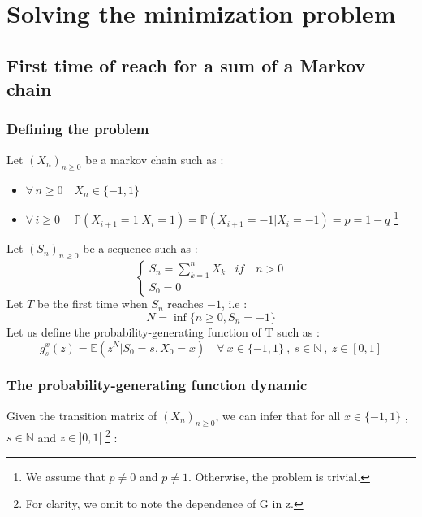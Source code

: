 \documentclass{article}
\begin{document}
\newpage
\section{Solving the minimization problem}
\subsection{First time of reach for a sum of a Markov chain}
\subsubsection{Defining the problem}

Let $(X_{n})_{n\geq0}$ be a markov chain such as :
\begin{itemize}
\item $\forall \, n\geq0 \quad X_{n} \in \{-1,1\} $ 
\item $\forall \, i\geq0 \quad\ \mathbb{P}( X_{i+1}=1 | X_{i}=1 ) = \mathbb{P}( X_{i+1}=-1 | X_{i}=-1 ) = p = 1-q$ \footnote{We assume that $p \ne 0$ and $p \ne 1$. Otherwise, the problem is trivial.}
\end{itemize}
Let $(S_{n})_{n\geq0}$ be a sequence such as :
\begin{equation}
     \begin{cases}
        S_{n} = \sum_{k=1}^{n}X_{k} & if \quad n > 0 \\
        S_{0} = 0
     \end{cases}
\end{equation}
Let $T$ be the first time when $S_{n}$ reaches $-1$, i.e  :
$$ N= \inf \{ n\geq0 , S_{n}=-1   \} $$
Let us define the  probability-generating function of T such as :
$$ g_{s}^{x}(z) = \mathbb{E}(z^{N} | S_{0}=s, X_{0}=x) \quad \forall \ x \in \{-1,1\} \ , \ s \in \mathbb{N} \ , \ z \in [0,1]  $$

\subsubsection{The probability-generating function dynamic}
Given the transition matrix of $(X_{n})_{n\geq0}$, we can infer that for all $x \in \{-1,1\}$ , $s \in \mathbb{N}$ and $z \in ]0,1[$ \footnote{For clarity, we omit to note the dependence of G in z.} :
\end{document}
